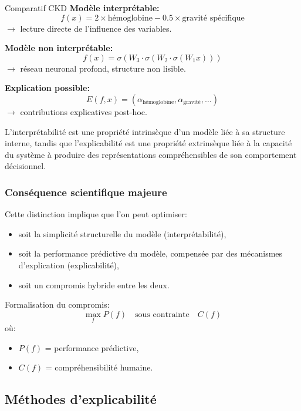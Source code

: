 \begin{exemple}{Comparatif CKD}
\textbf{Modèle interprétable:}
\[
f(x) = 2 \times \text{hémoglobine} - 0.5 \times \text{gravité spécifique}
\]
$\rightarrow$ lecture directe de l’influence des variables.

\textbf{Modèle non interprétable:}
\[
f(x) = \sigma(W_3 \cdot \sigma(W_2 \cdot \sigma(W_1 x)))
\]
$\rightarrow$ réseau neuronal profond, structure non lisible.

\textbf{Explication possible:}
\[
E(f, x) = (\alpha_{\text{hémoglobine}}, \alpha_{\text{gravité}}, \dots)
\]
$\rightarrow$ contributions explicatives post-hoc.
\end{exemple}

\begin{pointcle}
L’interprétabilité est une propriété intrinsèque d’un modèle liée à sa structure interne, tandis que l’explicabilité est une propriété extrinsèque liée à la capacité du système à produire des représentations compréhensibles de son comportement décisionnel.
\end{pointcle}

\subsubsection{Conséquence scientifique majeure}

Cette distinction implique que l’on peut optimiser:
\begin{itemize}
    \item soit la simplicité structurelle du modèle (interprétabilité),
    \item soit la performance prédictive du modèle, compensée par des mécanismes d’explication (explicabilité),
    \item soit un compromis hybride entre les deux.
\end{itemize}

Formalisation du compromis:
\[
\max_f P(f) \quad \text{sous contrainte} \quad C(f)
\]
où:
\begin{itemize}
    \item $P(f)$ = performance prédictive,
    \item $C(f)$ = compréhensibilité humaine.
\end{itemize}

\subsection{Méthodes d’explicabilité}

